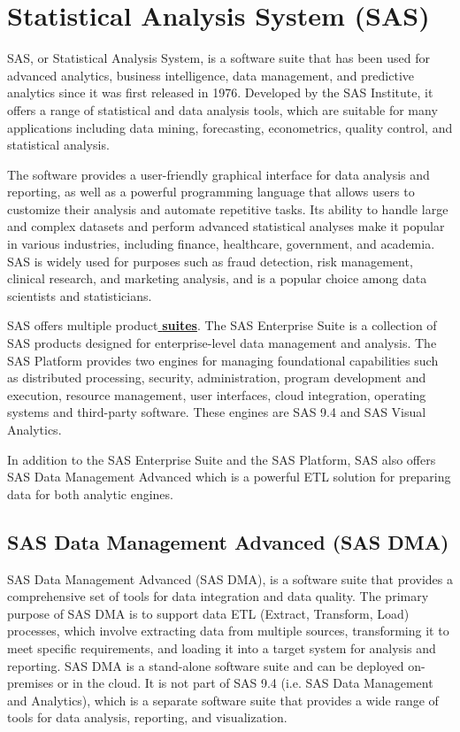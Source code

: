 \section{Statistical Analysis System (SAS)} \label{section: SAS}
SAS, or Statistical Analysis System, is a software suite that has been used for advanced analytics, business intelligence, data management, and predictive analytics since it was first released in 1976. Developed by the SAS Institute, it offers a range of statistical and data analysis tools, which are suitable for many applications including data mining, forecasting, econometrics, quality control, and statistical analysis.

The software provides a user-friendly graphical interface for data analysis and reporting, as well as a powerful programming language that allows users to customize their analysis and automate repetitive tasks. Its ability to handle large and complex datasets and perform advanced statistical analyses make it popular in various industries, including finance, healthcare, government, and academia. SAS is widely used for purposes such as fraud detection, risk management, clinical research, and marketing analysis, and is a popular choice among data scientists and statisticians. 

SAS offers multiple product\href{https://www.sas.com/en_us/software/all-products.html#all-products-a-z}{\textbf{ suites}}. The SAS Enterprise Suite is a collection of SAS products designed for enterprise-level data management and analysis. The SAS Platform provides two engines for managing foundational capabilities such as distributed processing, security, administration, program development and execution, resource management, user interfaces, cloud integration, operating systems and third-party software. These engines are SAS 9.4 and SAS Visual Analytics. 

In addition to the SAS Enterprise Suite and the SAS Platform, SAS also offers SAS Data Management Advanced which is a powerful ETL solution for preparing data for both analytic engines.

\subsection{SAS Data Management Advanced (SAS DMA)}
SAS Data Management Advanced (SAS DMA), is a software suite that provides a comprehensive set of tools for data integration and data quality. The primary purpose of SAS DMA is to support data ETL (Extract, Transform, Load) processes, which involve extracting data from multiple sources, transforming it to meet specific requirements, and loading it into a target system for analysis and reporting. SAS DMA is a stand-alone software suite and can be deployed on-premises or in the cloud. It is not part of SAS 9.4 (i.e. SAS Data Management and Analytics), which is a separate software suite that provides a wide range of tools for data analysis, reporting, and visualization.


